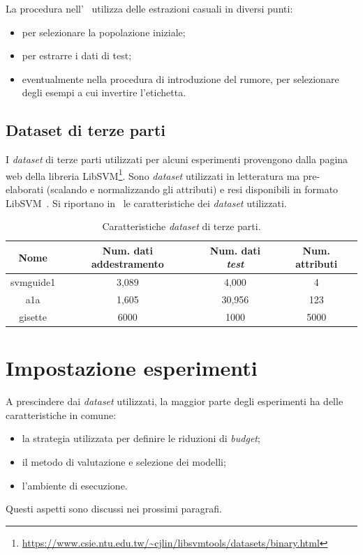 La procedura nell'~ utilizza delle estrazioni casuali in diversi punti:
\begin{itemize}
    \item per selezionare la popolazione iniziale;
    \item per estrarre i dati di test;
    \item eventualmente nella procedura di introduzione del rumore, per selezionare degli esempi a cui invertire l'etichetta.
\end{itemize}

\subsection{Dataset di terze parti}
I \emph{dataset} di terze parti utilizzati per alcuni esperimenti provengono dalla pagina web della libreria LibSVM\footnote{\url{https://www.csie.ntu.edu.tw/~cjlin/libsvmtools/datasets/binary.html}}.
Sono \emph{dataset} utilizzati in letteratura ma pre-elaborati (scalando e normalizzando gli attributi) e resi disponibili in formato LibSVM~\cite{libsvm}.
Si riportano in~ le caratteristiche dei \emph{dataset} utilizzati.
\begin{table}
    \centering
    \begin{tabular}{cccc}
        \toprule
        Nome & Num. dati addestramento & Num. dati \emph{test} & Num. attributi\\
        \midrule
        svmguide1 &  3,089 & 4,000 & 4 \\
        a1a & 1,605	& 30,956 & 123\\
        gisette & 6000 & 1000 & 5000 \\
        \bottomrule
    \end{tabular}
    \caption{Caratteristiche \emph{dataset} di terze parti.}
    \label{tab:uci_datasets}
\end{table}


\section{Impostazione esperimenti}\label{sec:impostazione_esperimenti}
A prescindere dai \emph{dataset} utilizzati, la maggior parte degli esperimenti ha delle caratteristiche in comune:
\begin{itemize}
    \item la strategia utilizzata per definire le riduzioni di \emph{budget};
    \item il metodo di valutazione e selezione dei modelli;
    \item l'ambiente di esecuzione.
\end{itemize}
Questi aspetti sono discussi nei prossimi paragrafi.

